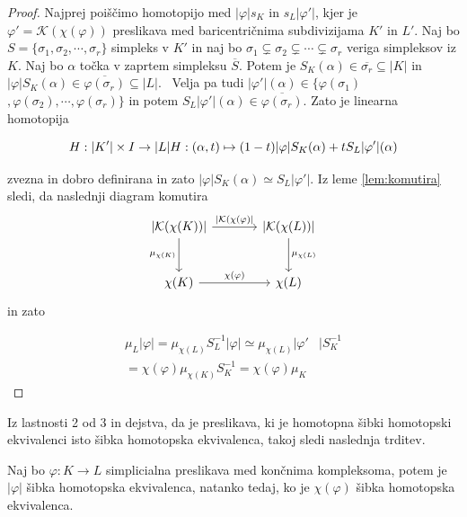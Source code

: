 \documentclass[mat1]{fmfdelo}
\DeclareRobustCommand{\k}{
    \mathcal{K}
}
\begin{document}
\begin{proof}
    Najprej poiščimo homotopijo med $|\varphi|s_K$ in $s_L|\varphi'|$, kjer je $\varphi'=\k(\chi(\varphi))$ preslikava med baricentričnima subdivizijama $K'$ in $L'$.
    Naj bo $S=\{\sigma_1,\sigma_2,\cdots,\sigma_r\}$ simpleks 
    v $K'$ in naj bo $\sigma_1 \subsetneq \sigma_2 \subsetneq 
    \cdots \subsetneq \sigma_r$ veriga simpleksov iz $K$. Naj bo $\alpha$
    točka v zaprtem simpleksu $\overline{S}$. Potem je $S_K(\alpha)
    \in \overline{\sigma_r}\subseteq |K|$ in  $|\varphi|S_K(\alpha) \in 
    \overline{\varphi(\sigma_r)}\subseteq |L|.$ \
    Velja pa tudi $|\varphi'|(\alpha)\in \{\varphi(\sigma_1)$$,\varphi(\sigma_2),\cdots,\varphi(\sigma_r)\}$
    in potem $S_L|\varphi'|(\alpha) \in \overline{\varphi(\sigma_r)}.$ Zato 
    je linearna homotopija



    \begin{centering}
        $$
        H:|K'|\times I \rightarrow |L| \\
        H: (\alpha,t) \mapsto (1-t)|\varphi|S_K(\alpha) + tS_L|\varphi'|(\alpha)\\
        $$
    \end{centering}
zvezna in dobro definirana in zato $|\varphi|S_K(\alpha) \simeq 
S_L|\varphi'|$. Iz leme \ref{lem:komutira} sledi, da naslednji diagram komutira 
\[\begin{tikzcd}[row sep=large, column sep=large]
    {|\k(\chi(K))|}\arrow{r}
   {|\k(\chi(\varphi)|} \arrow[swap]{d}{\mu_{\chi(K)}} & {|\k(\chi(L))|} \arrow{d}{\mu_{\chi(L)}} \\
   \chi(K) \arrow{r}{\chi(\varphi)} & \chi(L)
   \end{tikzcd}
   \]
in zato

\begin{align*}
    \mu_L|\varphi|=\mu_{\chi(L)}S_L^{-1}|\varphi| \simeq \mu_{\chi(L)}|\varphi'&|S_K^{-1} \\
    =\chi(\varphi)\mu_{\chi(K)}S_K^{-1} =\chi(\varphi)\mu_K&
  \end{align*}
\end{proof}

Iz lastnosti 2 od 3 in dejstva, da je preslikava, ki je homotopna šibki homotopski ekvivalenci isto šibka homotopska ekvivalenca, takoj sledi naslednja trditev.

\begin{trditev}
    Naj bo $\varphi : K\rightarrow L$ simplicialna preslikava med končnima kompleksoma, potem je $|\varphi|$ šibka homotopska ekvivalenca, natanko tedaj, ko je $\chi(\varphi)$ šibka homotopska ekvivalenca.
\end{trditev}
\end{document}
